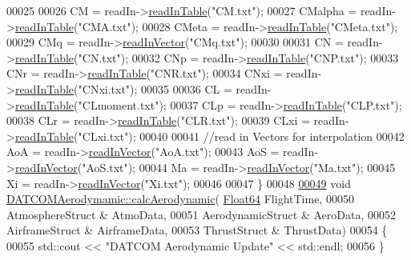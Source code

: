 \begin{DoxyCode}
00025 
00026     CM      = readIn->\hyperlink{classread_in_data_af616573832efc2c27f07f5f6877b1386}{readInTable}(\textcolor{stringliteral}{"CM.txt"});
00027     CMalpha = readIn->\hyperlink{classread_in_data_af616573832efc2c27f07f5f6877b1386}{readInTable}(\textcolor{stringliteral}{"CMA.txt"});
00028     CMeta   = readIn->\hyperlink{classread_in_data_af616573832efc2c27f07f5f6877b1386}{readInTable}(\textcolor{stringliteral}{"CMeta.txt"});
00029     CMq     = readIn->\hyperlink{classread_in_data_ab57aff38529234593d786ecace301cf7}{readInVector}(\textcolor{stringliteral}{"CMq.txt"});
00030 
00031     CN      = readIn->\hyperlink{classread_in_data_af616573832efc2c27f07f5f6877b1386}{readInTable}(\textcolor{stringliteral}{"CN.txt"});
00032     CNp     = readIn->\hyperlink{classread_in_data_af616573832efc2c27f07f5f6877b1386}{readInTable}(\textcolor{stringliteral}{"CNP.txt"});
00033     CNr     = readIn->\hyperlink{classread_in_data_af616573832efc2c27f07f5f6877b1386}{readInTable}(\textcolor{stringliteral}{"CNR.txt"});
00034     CNxi    = readIn->\hyperlink{classread_in_data_af616573832efc2c27f07f5f6877b1386}{readInTable}(\textcolor{stringliteral}{"CNxi.txt"});
00035 
00036     CL      = readIn->\hyperlink{classread_in_data_af616573832efc2c27f07f5f6877b1386}{readInTable}(\textcolor{stringliteral}{"CLmoment.txt"});
00037     CLp     = readIn->\hyperlink{classread_in_data_af616573832efc2c27f07f5f6877b1386}{readInTable}(\textcolor{stringliteral}{"CLP.txt"});
00038     CLr     = readIn->\hyperlink{classread_in_data_af616573832efc2c27f07f5f6877b1386}{readInTable}(\textcolor{stringliteral}{"CLR.txt"});
00039     CLxi    = readIn->\hyperlink{classread_in_data_af616573832efc2c27f07f5f6877b1386}{readInTable}(\textcolor{stringliteral}{"CLxi.txt"});
00040 
00041     \textcolor{comment}{//read in Vectors for interpolation}
00042     AoA = readIn->\hyperlink{classread_in_data_ab57aff38529234593d786ecace301cf7}{readInVector}(\textcolor{stringliteral}{"AoA.txt"});
00043     AoS = readIn->\hyperlink{classread_in_data_ab57aff38529234593d786ecace301cf7}{readInVector}(\textcolor{stringliteral}{"AoS.txt"});
00044     Ma = readIn->\hyperlink{classread_in_data_ab57aff38529234593d786ecace301cf7}{readInVector}(\textcolor{stringliteral}{"Ma.txt"});
00045     Xi = readIn->\hyperlink{classread_in_data_ab57aff38529234593d786ecace301cf7}{readInVector}(\textcolor{stringliteral}{"Xi.txt"});
00046 
00047 \}
00048 
\hyperlink{group___aerodynamic_a2c31940a25ec9396657d701ef3004327}{00049} \textcolor{keywordtype}{void} \hyperlink{group___aerodynamic_a2c31940a25ec9396657d701ef3004327}{DATCOMAerodymamic::calcAerodynamic}(
      \hyperlink{group___tools_ga3f1431cb9f76da10f59246d1d743dc2c}{Float64} FlightTime,
00050                                         AtmosphereStruct & AtmoData,
00051                                         AerodynamicStruct & AeroData,
00052                                         AirframeStruct & AirframeData,
00053                                         ThrustStruct & ThrustData)
00054 \{
00055     std::cout << \textcolor{stringliteral}{"DATCOM Aerodynamic Update"} << std::endl;
00056 \}
\end{DoxyCode}
